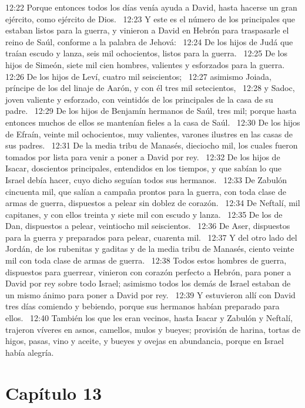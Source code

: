12:22 Porque entonces todos los días venía ayuda a David, hasta hacerse un gran ejército, como ejército de Dios.  
12:23 Y este es el número de los principales que estaban listos para la guerra, y vinieron a David en Hebrón para traspasarle el reino de Saúl, conforme a la palabra de Jehová:  
12:24 De los hijos de Judá que traían escudo y lanza, seis mil ochocientos, listos para la guerra.  
12:25 De los hijos de Simeón, siete mil cien hombres, valientes y esforzados para la guerra.  
12:26 De los hijos de Leví, cuatro mil seiscientos;  
12:27 asimismo Joiada, príncipe de los del linaje de Aarón, y con él tres mil setecientos,  
12:28 y Sadoc, joven valiente y esforzado, con veintidós de los principales de la casa de su padre.  
12:29 De los hijos de Benjamín hermanos de Saúl, tres mil; porque hasta entonces muchos de ellos se mantenían fieles a la casa de Saúl.  
12:30 De los hijos de Efraín, veinte mil ochocientos, muy valientes, varones ilustres en las casas de sus padres.  
12:31 De la media tribu de Manasés, dieciocho mil, los cuales fueron tomados por lista para venir a poner a David por rey.  
12:32 De los hijos de Isacar, doscientos principales, entendidos en los tiempos, y que sabían lo que Israel debía hacer, cuyo dicho seguían todos sus hermanos.  
12:33 De Zabulón cincuenta mil, que salían a campaña prontos para la guerra, con toda clase de armas de guerra, dispuestos a pelear sin doblez de corazón.  
12:34 De Neftalí, mil capitanes, y con ellos treinta y siete mil con escudo y lanza.  
12:35 De los de Dan, dispuestos a pelear, veintiocho mil seiscientos.  
12:36 De Aser, dispuestos para la guerra y preparados para pelear, cuarenta mil.  
12:37 Y del otro lado del Jordán, de los rubenitas y gaditas y de la media tribu de Manasés, ciento veinte mil con toda clase de armas de guerra.  
12:38 Todos estos hombres de guerra, dispuestos para guerrear, vinieron con corazón perfecto a Hebrón, para poner a David por rey sobre todo Israel; asimismo todos los demás de Israel estaban de un mismo ánimo para poner a David por rey.  
12:39 Y estuvieron allí con David tres días comiendo y bebiendo, porque sus hermanos habían preparado para ellos.  
12:40 También los que les eran vecinos, hasta Isacar y Zabulón y Neftalí, trajeron víveres en asnos, camellos, mulos y bueyes; provisión de harina, tortas de higos, pasas, vino y aceite, y bueyes y ovejas en abundancia, porque en Israel había alegría.  

\section*{Capítulo 13}


